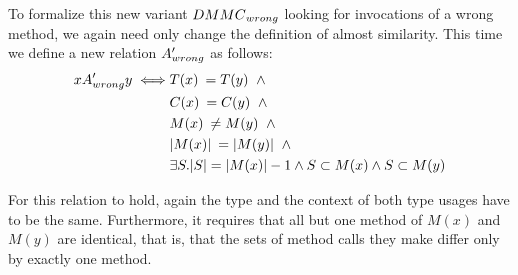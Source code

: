 
To formalize this new variant $\mathnormal{DMMC}_{\mathnormal{wrong}}$ looking for invocations of a wrong method, we again need only change the definition of almost similarity.
This time we define a new relation $A'_{\mathnormal{wrong}}$ as follows:
\begin{align*}
xA'_{\mathnormal{wrong}}y \iff & T(x) \: = T(y) \;\; \land \\
                                & C(x) \: = C(y) \;\; \land \\
                                & M(x) \: \neq M(y) \;\; \land \\
                                & |M(x)| \:  = |M(y)| \;\; \land \\
                                & \exists S . |S| = |M(x)| - 1 \land S \subset M(x) \land S \subset M(y)
\end{align*}

For this relation to hold, again the type and the context of both type usages have to be the same.
Furthermore, it requires that all but one method of $M(x)$ and $M(y)$ are identical, that is, that the sets of method calls they make differ only by exactly one method.




